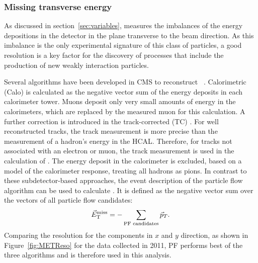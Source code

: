 \subsubsection{Missing transverse energy}
As discussed in section~\ref{sec:variables}, \MET measures the imbalances of the energy depositions in the detector in the plane transverse to the beam direction. As this imbalance is the only experimental signature of this class of particles, a good \MET resolution is a key factor for the discovery of processes that include the production of new weakly interaction particles. 

Several algorithms have been developed in CMS to reconstruct \MET~\cite{7TeVMETPaper}. Calorimetric (Calo) \METVec is calculated as the negative vector sum of the energy deposits in each calorimeter tower. Muons deposit only very small amounts of energy in the calorimeters, which are replaced by the measured muon \pt for this calculation. A further correction is introduced in the track-corrected (TC) \METVec. For well reconstructed tracks, the track measurement is more precise than the measurement of a hadron's energy in the HCAL. Therefore, for tracks not associated with an electron or  muon, the track measurement is used in the calculation of \METVec. The energy deposit in the calorimeter is excluded, based on a model of the calorimeter response, treating all hadrons as pions. In contrast to these subdetector-based approaches, the event description of the particle flow algorithm can be used to calculate \METVec. It is defined as the negative vector sum over the \pt vectors of all particle flow candidates:
\begin{equation}
 \vec{E}_{\mathrm{T}}^{\mathrm{miss}} = - \sum\limits_{\text{PF candidates}} \vec{p}_T.
\end{equation}
Comparing the resolution for the \MET components in $x$ and $y$ direction, as shown in Figure~\ref{fig:METReso} for the data collected in 2011, PF \MET performs best of the three algorithms and is therefore used in this analysis.
